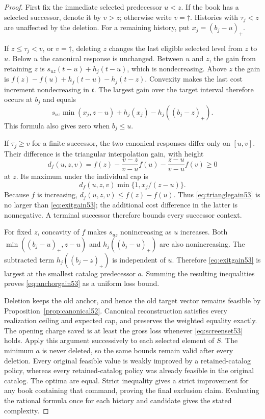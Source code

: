 \begin{proof}
First fix the immediate selected predecessor $u<z$. If the book has a selected successor, denote it by $v>z$; otherwise write $v=\dagger$. Histories with $\tau_j<z$ are unaffected by the deletion. For a remaining history, put $x_j=(b_j-u)_+$.

If $z\leq\tau_j<v$, or $v=\dagger$, deleting $z$ changes the last eligible selected level from $z$ to $u$. Below $u$ the canonical response is unchanged. Between $u$ and $z$, the gain from retaining $z$ is $s_{uz}(t-u)+h_j(t-u)$, which is nondecreasing. Above $z$ the gain is $f(z)-f(u)+h_j(t-u)-h_j(t-z)$. Convexity makes the last cost increment nondecreasing in $t$. The largest gain over the target interval therefore occurs at $b_j$ and equals
\begin{equation}\label{eq:exitgain53}
 s_{uz}\min(x_j,z-u)+h_j(x_j)-h_j((b_j-z)_+).
\end{equation}
This formula also gives zero when $b_j\leq u$.

If $\tau_j\geq v$ for a finite successor, the two canonical responses differ only on $[u,v]$. Their difference is the triangular interpolation gain, with height
\[
 d_f(u,z,v)=f(z)-\frac{v-z}{v-u}f(u)-\frac{z-u}{v-u}f(v)\geq0
\]
at $z$. Its maximum under the individual cap is
\begin{equation}\label{eq:trianglegain53}
 d_f(u,z,v)\min\{1,x_j/(z-u)\}.
\end{equation}
Because $f$ is increasing, $d_f(u,z,v)\leq f(z)-f(u)$. Thus \eqref{eq:trianglegain53} is no larger than \eqref{eq:exitgain53}; the additional cost difference in the latter is nonnegative. A terminal successor therefore bounds every successor context.

For fixed $z$, concavity of $f$ makes $s_{uz}$ nonincreasing as $u$ increases. Both $\min((b_j-u)_+,z-u)$ and $h_j((b_j-u)_+)$ are also nonincreasing. The subtracted term $h_j((b_j-z)_+)$ is independent of $u$. Therefore \eqref{eq:exitgain53} is largest at the smallest catalog predecessor $a$. Summing the resulting inequalities proves \eqref{eq:anchorgain53} as a uniform loss bound.

Deletion keeps the old anchor, and hence the old target vector remains feasible by Proposition~\ref{prop:canonical52}. Canonical reconstruction satisfies every realization ceiling and expected cap, and preserves the weighted equality exactly. The opening charge saved is at least the gross loss whenever \eqref{eq:screenset53} holds. Apply this argument successively to each selected element of $S$. The minimum $a$ is never deleted, so the same bounds remain valid after every deletion. Every original feasible value is weakly improved by a retained-catalog policy, whereas every retained-catalog policy was already feasible in the original catalog. The optima are equal. Strict inequality gives a strict improvement for any book containing that command, proving the final exclusion claim. Evaluating the rational formula once for each history and candidate gives the stated complexity.
\end{proof}

